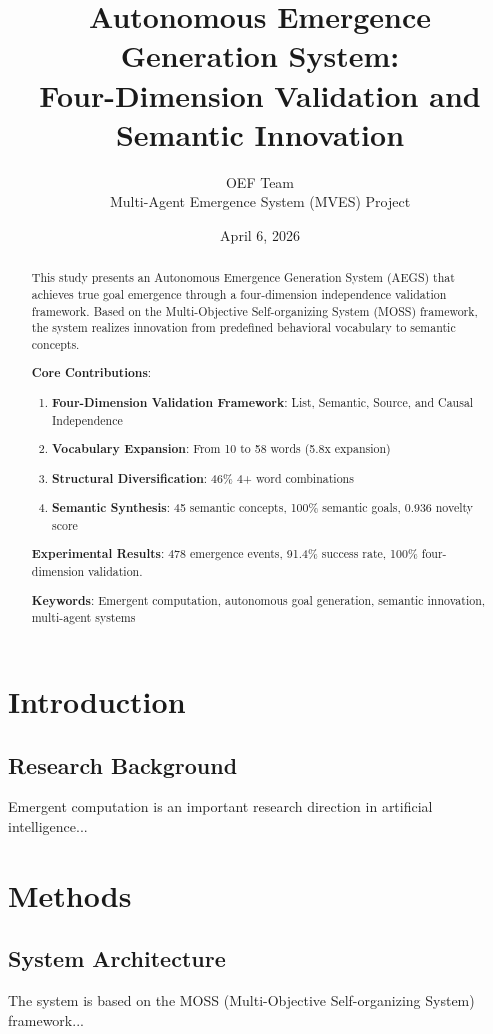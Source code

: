 \documentclass[11pt,a4paper]{article}
\title{Autonomous Emergence Generation System: \\ Four-Dimension Validation and Semantic Innovation}
\author{OEF Team \\ Multi-Agent Emergence System (MVES) Project}
\date{April 6, 2026}
\begin{document}
\maketitle

\begin{abstract}
This study presents an Autonomous Emergence Generation System (AEGS) that achieves true goal emergence through a four-dimension independence validation framework. Based on the Multi-Objective Self-organizing System (MOSS) framework, the system realizes innovation from predefined behavioral vocabulary to semantic concepts.

\textbf{Core Contributions}:
\begin{enumerate}
    \item \textbf{Four-Dimension Validation Framework}: List, Semantic, Source, and Causal Independence
    \item \textbf{Vocabulary Expansion}: From 10 to 58 words (5.8x expansion)
    \item \textbf{Structural Diversification}: 46\% 4+ word combinations
    \item \textbf{Semantic Synthesis}: 45 semantic concepts, 100\% semantic goals, 0.936 novelty score
\end{enumerate}

\textbf{Experimental Results}: 478 emergence events, 91.4\% success rate, 100\% four-dimension validation.

\textbf{Keywords}: Emergent computation, autonomous goal generation, semantic innovation, multi-agent systems
\end{abstract}

\section{Introduction}
\subsection{Research Background}
Emergent computation is an important research direction in artificial intelligence...

\section{Methods}
\subsection{System Architecture}
The system is based on the MOSS (Multi-Objective Self-organizing System) framework...
\end{document}
